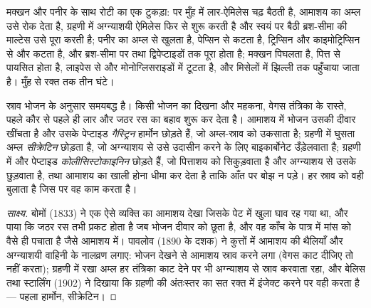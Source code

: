 \begin{example}[किसी भोजन का रसायन]\label{ex:b1:digestion-absorption:meal}
मक्खन और पनीर के साथ रोटी का एक टुकड़ा:  पर मुँह में लार-ऐमिलेस चढ़
बैठती है, आमाशय का अम्ल उसे रोक देता है, ग्रहणी में अग्न्याशयी ऐमिलेस
फिर से शुरू करती है और स्वयं  पर बैठी ब्रश-सीमा की माल्टेस
उसे पूरा करती है; पनीर का  अम्ल से खुलता है, पेप्सिन से कटता है,
ट्रिप्सिन और काइमोट्रिप्सिन से और कटता है, और ब्रश-सीमा पर 
तथा द्विपेप्टाइडों तक पूरा होता है; मक्खन पिघलता है, पित्त से पायसित
होता है, लाइपेस से  और मोनोग्लिसराइडों में टूटता है, और
मिसेलों में झिल्ली तक पहुँचाया जाता है। मुँह से रक्त तक तीन घंटे।
\end{example}

\begin{proposition}[स्राव का नियंत्रण]\label{prop:b1:digestion-absorption:control}
स्राव भोजन के अनुसार समयबद्ध है। किसी भोजन का दिखना और महकना, वेगस
तंत्रिका के रास्ते, पहले कौर से पहले ही लार और जठर रस का बहाव शुरू कर
देता है। आमाशय में भोजन उसकी दीवार खींचता है और उसके पेप्टाइड
\emph{गैस्ट्रिन} हार्मोन छोड़ते हैं, जो अम्ल-स्राव को उकसाता है; ग्रहणी
में घुसता अम्ल \emph{सीक्रेटिन} छोड़ता है, जो अग्न्याशय से उसे उदासीन
करने के लिए बाइकार्बोनेट उँड़ेलवाता है; ग्रहणी में  और पेप्टाइड
\emph{कोलीसिस्टोकाइनिन} छोड़ते हैं, जो पित्ताशय को सिकुड़वाता है और
अग्न्याशय से उसके  छुड़वाता है, तथा आमाशय का खाली होना धीमा कर
देता है ताकि आँत पर बोझ न पड़े। हर स्राव को वही  बुलाता है
जिस पर वह काम करता है।
\end{proposition}
\begin{proof}[साक्ष्य]
बोमों (1833) ने एक ऐसे व्यक्ति का आमाशय देखा जिसके पेट में खुला घाव रह
गया था, और पाया कि जठर रस तभी प्रकट होता है जब भोजन दीवार को छूता है, और
वह काँच के पात्र में मांस को वैसे ही पचाता है जैसे आमाशय में। पावलोव
(1890 के दशक) ने कुत्तों में आमाशय की थैलियाँ और अग्न्याशयी वाहिनी के
नालव्रण लगाए: भोजन देखने से आमाशय स्राव करने लगा (वेगस काट दीजिए तो नहीं
करता); ग्रहणी में रखा अम्ल हर तंत्रिका काट देने पर भी अग्न्याशय से स्राव
करवाता रहा, और बेलिस तथा स्टार्लिंग (1902) ने दिखाया कि ग्रहणी की
अंतःस्तर का सत रक्त में इंजेक्ट करने पर वही करता है --- पहला हार्मोन,
सीक्रेटिन।
\end{proof}

